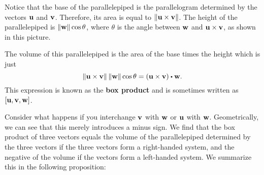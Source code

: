 Notice that the base of the parallelepiped is the parallelogram
determined by the vectors $\vect{u}$ and $\vect{v}$. Therefore, its
area is equal to $\norm{\vect{u}\times\vect{v}}$. The height of the
parallelepiped is $\norm{\vect{w}}\cos\theta$, where $\theta$ is the
angle between $\vect{w}$ and $\vect{u}\times\vect{v}$, as shown in
this picture.
\begin{center}
\end{center}
The volume of this parallelepiped is the area of the base times the
height which is just
\begin{equation*}
  \norm{\vect{u}\times \vect{v}} \norm{\vect{w}} \cos \theta =
  (\vect{u}\times\vect{v}) \dotprod \vect{w}.
\end{equation*}
This expression is known as the
\textbf{box product} and is sometimes written as
$\boxprod{\vect{u},\vect{v},\vect{w}}$.

Consider what happens if you interchange $\vect{v}$ with $\vect{w}$ or
$\vect{u}$ with $\vect{w}$.  Geometrically, we can see that this
merely introduces a minus sign. We find that the box product of three
vectors equals the volume of the parallelepiped determined by the
three vectors if the three vectors form a right-handed system, and the
negative of the volume if the vectors form a left-handed system.
We summarize this in the following proposition:

